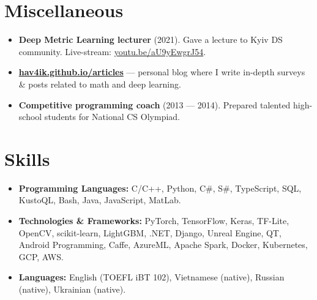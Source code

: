 \documentclass[letterpaper,11pt]{article}
\newcommand{\resumeItemWithHeader}[2]{
  \item[--]\small{
    \textbf{#1}{ #2 \vspace{-2pt}}
  }
}
\newcommand{\resumeSubItem}[2]{\resumeItemWithHeader{#1}{#2}\vspace{-4pt}}
\newcommand{\resumeSubHeadingListStart}{\begin{itemize}[leftmargin=*]}
\newcommand{\resumeSubHeadingListEnd}{\end{itemize}}
\begin{document}
\section{Miscellaneous}
  \resumeSubHeadingListStart
    \resumeSubItem{Deep Metric Learning lecturer}
      {(2021). Gave a lecture to Kyiv DS community. Live-stream: \href{https://youtu.be/aU9yEwgrJ54}{youtu.be/aU9yEwgrJ54}.}
    \resumeSubItem{\href{https://hav4ik.github.io/articles}{hav4ik.github.io/articles}}
      {--- personal blog where I write in-depth surveys \& posts related to math and deep learning.}
    \resumeSubItem{Competitive programming coach}
      {(2013 --- 2014). Prepared talented high-school students for National CS Olympiad.}
    
  \resumeSubHeadingListEnd

\section{Skills}
  \resumeSubHeadingListStart
    \resumeSubItem{\bf Programming Languages:}
      {C/C++, Python, C\#, S\#, TypeScript, SQL, KustoQL, Bash, Java, JavaScript, MatLab.}
    \resumeSubItem{\bf Technologies \& Frameworks:}
      {PyTorch, TensorFlow, Keras, TF-Lite, OpenCV, scikit-learn, LightGBM, .NET, Django, Unreal Engine, QT, Android Programming, Caffe, AzureML, Apache Spark, Docker, Kubernetes, GCP, AWS.}
    \resumeSubItem{\bf Languages:}
      {English (TOEFL iBT 102), Vietnamese (native), Russian (native), Ukrainian (native).}
  \resumeSubHeadingListEnd


\end{document}
